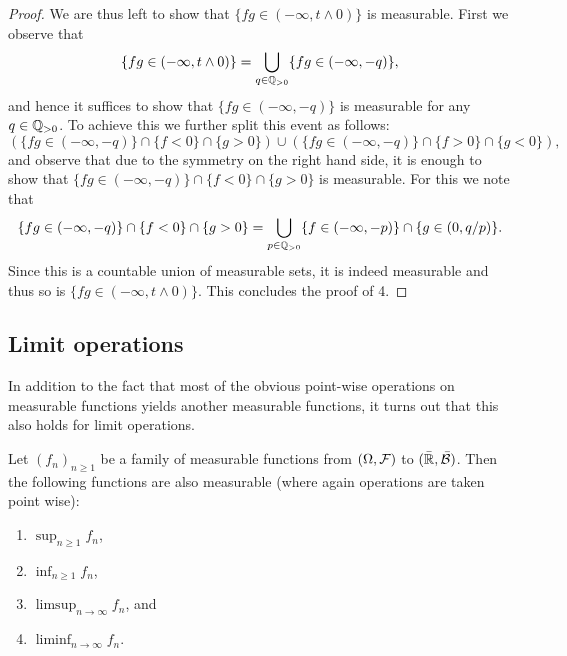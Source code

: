 \begin{proof}
We are thus left to show that $\{fg \in (-\infty, t \wedge 0)\}$ is measurable. First we observe that
\[
	\{fg \in (-\infty, t \wedge 0)\} = \bigcup_{q \in \mathbb Q_{>0}} \{fg \in (-\infty,-q)\},
\]
and hence it suffices to show that $\{fg \in (-\infty,-q)\}$ is measurable for any $q \in \mathbb Q_{>0}$. To achieve this we further split this event as follows:
\[
	\left(\{fg \in (-\infty,-q)\} \cap \{f < 0\} \cap \{g > 0\}\right) 
	\cup \left(\{fg \in (-\infty,-q)\} \cap \{f > 0\} \cap \{g < 0\}\right),
\]
and observe that due to the symmetry on the right hand side, it is enough to show that $\{fg \in (-\infty,-q)\} \cap \{f < 0\} \cap \{g > 0\}$ is measurable. For this we note that
\[
	\{fg \in (-\infty,-q)\} \cap \{f < 0\} \cap \{g > 0\} 
	= \bigcup_{p \in \mathbb Q_{>0}} \{f \in (-\infty, -p)\} \cap \{g \in (0, q/p)\}.
\]
Since this is a countable union of measurable sets, it is indeed measurable and thus so is $\{fg \in (-\infty, t \wedge 0)\}$. This concludes the proof of 4.
\end{proof}

\subsection{Limit operations}

In addition to the fact that most of the obvious point-wise operations on measurable functions yields another measurable functions, it turns out that this also holds for limit operations. 

\begin{lemma}
Let $(f_n)_{n \ge 1}$ be a family of measurable functions from $(\Omega, \mathcal F)$ to  $(\bar{\mathbb R}, \bar{\mathcal B})$. Then the following functions are also measurable (where again operations are taken point wise):
\begin{enumerate}
\item $\sup_{n \ge 1} f_n$,
\item $\inf_{n \ge 1} f_n$,
\item $\limsup_{n \to \infty} f_n$, and
\item $\liminf_{n \to \infty} f_n$.
\end{enumerate}
\end{lemma}

